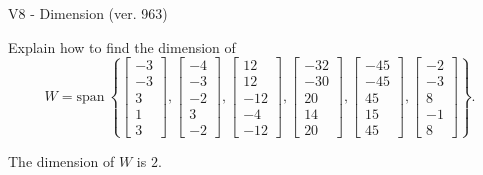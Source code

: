 \begin{exercise}
  \begin{exerciseTitle}V8 - Dimension (ver. 963)\end{exerciseTitle}
  \begin{exerciseStatement}
    Explain how to find the dimension of 
\[W=\mathrm{span}\ \left\{\left[\begin{array}{r}
-3 \\
-3 \\
3 \\
1 \\
3
\end{array}\right] , \left[\begin{array}{r}
-4 \\
-3 \\
-2 \\
3 \\
-2
\end{array}\right] , \left[\begin{array}{r}
12 \\
12 \\
-12 \\
-4 \\
-12
\end{array}\right] , \left[\begin{array}{r}
-32 \\
-30 \\
20 \\
14 \\
20
\end{array}\right] , \left[\begin{array}{r}
-45 \\
-45 \\
45 \\
15 \\
45
\end{array}\right] , \left[\begin{array}{r}
-2 \\
-3 \\
8 \\
-1 \\
8
\end{array}\right]\right\}.\]



  \end{exerciseStatement}
  \begin{exerciseAnswer}
   The dimension of \(W\) is  \(2\).
  


  \end{exerciseAnswer}
\end{exercise}